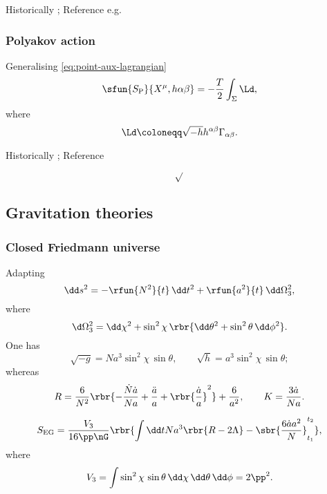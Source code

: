 \documentclass[a4paper,11pt]{article}
\begin{document}
Historically \cite{Nambu1970,Goto1971}; Reference e.g.\ 
\cite{Blumenhagen2013}
\cite[sec.\ 3.2]{Kiefer2012}

\subsubsection*{Polyakov action}

Generalising \eqref{eq:point-aux-lagrangian}
\begin{equation}
\sfun{S_\text{P}}{X^\mu, h{\alpha\beta}} = -\frac{T}{2}\int_\Sigma \Ld,
\end{equation}
where
\begin{equation}
\Ld \coloneqq \sqrt{-h} h^{\alpha\beta}\Gamma_{\alpha\beta}.
\end{equation}



Historically \cite{Brink1976,Deser1976,Polyakov1981};
Reference
\cite[sec.\ 3.2]{Kiefer2012}


\begin{equation}
\sqrt{}
\end{equation}



\subsection{Gravitation theories}

\subsubsection*{Closed Friedmann universe}
\cite[sec.\ 8.1.2]{Kiefer2012}
Adapting
\begin{equation}
\dd s^2 = -\rfun{N^2}{t}\,\dd t^2 + \rfun{a^2}{t}\,\dd\Omega_3^2,
\end{equation}
where
\begin{equation}
\d\Omega_3^2 = \dd\chi^2+\sin^2\chi\,\rbr{\dd\theta^2+\sin^2\theta\,\dd\phi^2}.
\end{equation}
One has
\begin{equation}
\sqrt{-g} = N a^3 \sin^2\chi\,\sin\theta,\qquad
\sqrt{h} = a^3\sin^2\chi\,\sin\theta;
\end{equation}
whereas
\begin{equation}
R = \frac{6}{N^2}\rbr{-\frac{\dot{N}\dot{a}}{Na} + \frac{\ddot{a}}{a} + 
\rbr{\frac{\dot{a}}{a}}^2} + \frac{6}{a^2},\qquad
K = \frac{3\dot{a}}{Na}.
\end{equation}

\begin{equation}
S_\text{EG} = \frac{V_3}{16\pp\nG} \rbr{\int\dd t Na^3\rbr{R - 2\Lambda}
- \sbr{\frac{6\dot{a}a^2}{N}}_{t_1}^{t_2}},
\end{equation}
where
\begin{equation}
V_3 = \int \sin^2\chi\,\sin\theta\,\dd\chi\,\dd\theta\,\dd\phi = 2\pp^2.
\end{equation}
\end{document}
